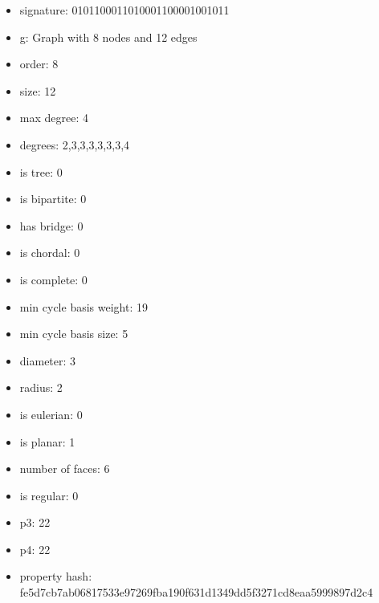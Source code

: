 \begin{itemize}
\item signature: 0101100011010001100001001011
\item g: Graph with 8 nodes and 12 edges
\item order: 8
\item size: 12
\item max degree: 4
\item degrees: 2,3,3,3,3,3,3,4
\item is tree: 0
\item is bipartite: 0
\item has bridge: 0
\item is chordal: 0
\item is complete: 0
\item min cycle basis weight: 19
\item min cycle basis size: 5
\item diameter: 3
\item radius: 2
\item is eulerian: 0
\item is planar: 1
\item number of faces: 6
\item is regular: 0
\item p3: 22
\item p4: 22
\item property hash: fe5d7cb7ab06817533e97269fba190f631d1349dd5f3271cd8eaa5999897d2c4
\end{itemize}
\newpage
\begin{figure}
\end{figure}
